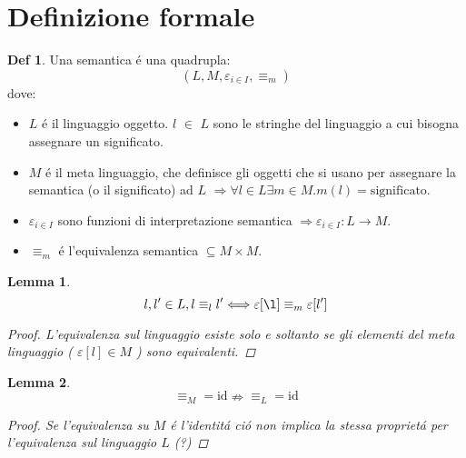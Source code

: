 \documentclass[a4paper]{report}
\theoremstyle{definition} \newtheorem*{defi}{Def}
\theoremstyle{plain} \newtheorem{lemma}{Lemma}
\theoremstyle{plain} \newtheorem{teo}{Teorema}
\theoremstyle{remark} \newtheorem*{es}{Esempio}
\begin{document}
\section{Definizione formale}
\begin{defi}
	Una semantica \'e una quadrupla:
	$$
	\left(L,M, \varepsilon_{i\in I}, \equiv_m\right)
	$$
	dove:
	\begin{itemize}
		\item $L$ \'e il linguaggio oggetto. $l$ $\in$ $L$ sono le stringhe del linguaggio a cui bisogna assegnare un significato.
		\item $M$ \'e il meta linguaggio, che definisce gli oggetti che si usano per assegnare la semantica (o il significato) ad $L$ $\Rightarrow \forall l \in L \exists m \in M . m(l) = \mathrm{significato}$.
		\item $\varepsilon_{i\in I}$ sono funzioni di interpretazione semantica $\Rightarrow \varepsilon_{i\in I} : L \rightarrow M $.
		\item $\equiv_m$ \'e l'equivalenza semantica $\subseteq M \times M$.
	\end{itemize}
\end{defi}
\begin{lemma}
	\begin{equation}
		l,l' \in L, l \equiv_l l' \Longleftrightarrow \varepsilon[\l] \equiv_m \varepsilon[l']
	\end{equation}
	\begin{proof}
		L'equivalenza sul linguaggio esiste solo e soltanto se gli elementi del meta linguaggio ( $\varepsilon[l] \in M$ ) sono equivalenti.
	\end{proof}
\end{lemma}
\begin{lemma}
	\begin{equation}
		\equiv_M = \mathrm{id} \nRightarrow \equiv_L = \mathrm{id}
	\end{equation}
	\begin{proof}
		Se l'equivalenza su $M$ \'e l'identit\'a ci\'o non implica la stessa propriet\'a per l'equivalenza sul linguaggio $L$ (?)
	\end{proof}
\end{lemma}
\end{document}
